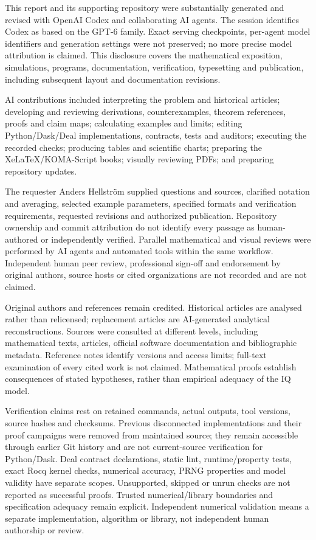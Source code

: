 This report and its supporting repository were substantially generated and
revised with OpenAI Codex and collaborating AI agents. The session identifies
Codex as based on the GPT-6 family. Exact serving checkpoints, per-agent model
identifiers and generation settings were not preserved; no more precise model
attribution is claimed. This disclosure covers the mathematical exposition,
simulations, programs, documentation, verification, typesetting and publication,
including subsequent layout and documentation revisions.

AI contributions included interpreting the problem and historical articles;
developing and reviewing derivations, counterexamples, theorem references,
proofs and claim maps; calculating examples and limits; editing
Python/Dask/Deal implementations, contracts, tests and auditors; executing
the recorded checks; producing tables and scientific charts; preparing the
XeLaTeX/KOMA-Script books; visually reviewing PDFs; and preparing repository
updates.

The requester Anders Hellström supplied questions and sources, clarified notation and
averaging, selected example parameters, specified formats and verification
requirements, requested revisions and authorized publication. Repository
ownership and commit attribution do not identify every passage as human-authored
or independently verified. Parallel mathematical and visual reviews were
performed by AI agents and automated tools within the same workflow.
Independent human peer review, professional sign-off and endorsement by
original authors, source hosts or cited organizations are not recorded and
are not claimed.

Original authors and references remain credited. Historical articles are
analysed rather than relicensed; replacement articles are AI-generated
analytical reconstructions. Sources were consulted at different levels,
including mathematical texts, articles, official software documentation and
bibliographic metadata. Reference notes identify versions and access limits;
full-text examination of every cited work is not claimed. Mathematical proofs
establish consequences of stated hypotheses, rather than empirical adequacy
of the IQ model.

Verification claims rest on retained commands, actual outputs, tool versions,
source hashes and checksums. Previous disconnected implementations and
their proof campaigns were removed from maintained source; they remain accessible
through earlier Git history and are not current-source verification for
Python/Dask. Deal contract declarations, static lint, runtime/property
tests, exact Rocq kernel checks, numerical accuracy, PRNG properties and
model validity have separate scopes. Unsupported, skipped or unrun checks
are not reported as successful proofs. Trusted numerical/library boundaries
and specification adequacy remain explicit.
Independent numerical validation means a separate implementation, algorithm or
library, not independent human authorship or review.

